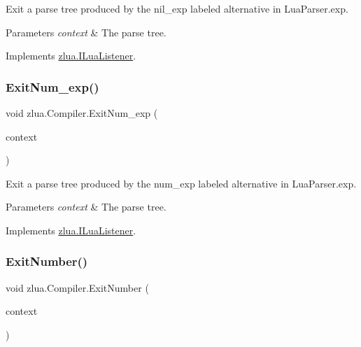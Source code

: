 Exit a parse tree produced by the {\ttfamily nil\+\_\+exp} labeled alternative in Lua\+Parser.\+exp. 


\begin{DoxyParams}{Parameters}
{\em context} & The parse tree.\\
\hline
\end{DoxyParams}


Implements \mbox{\hyperlink{interfacezlua_1_1_i_lua_listener_a7b5aa1a0b4e1441c884028a324f69439}{zlua.\+I\+Lua\+Listener}}.

\mbox{\label{classzlua_1_1_compiler_a3a76d8ff765978e61655469c1277c65e}} 
\subsubsection{\texorpdfstring{Exit\+Num\+\_\+exp()}{ExitNum\_exp()}}
{\footnotesize\ttfamily void zlua.\+Compiler.\+Exit\+Num\+\_\+exp (\begin{DoxyParamCaption}\item[{\mbox{[}\+Not\+Null\mbox{]} \mbox{\hyperlink{classzlua_1_1_lua_parser_1_1_num__exp_context}{Lua\+Parser.\+Num\+\_\+exp\+Context}}}]{context }\end{DoxyParamCaption})}



Exit a parse tree produced by the {\ttfamily num\+\_\+exp} labeled alternative in Lua\+Parser.\+exp. 


\begin{DoxyParams}{Parameters}
{\em context} & The parse tree.\\
\hline
\end{DoxyParams}


Implements \mbox{\hyperlink{interfacezlua_1_1_i_lua_listener_ae345a5af97b04861ba3ce16cf1e33808}{zlua.\+I\+Lua\+Listener}}.

\mbox{\label{classzlua_1_1_compiler_a89a20cafde0ae8bc4079c91635b47c5f}} 
\subsubsection{\texorpdfstring{Exit\+Number()}{ExitNumber()}}
{\footnotesize\ttfamily void zlua.\+Compiler.\+Exit\+Number (\begin{DoxyParamCaption}\item[{\mbox{[}\+Not\+Null\mbox{]} \mbox{\hyperlink{classzlua_1_1_lua_parser_1_1_number_context}{Lua\+Parser.\+Number\+Context}}}]{context }\end{DoxyParamCaption})}



